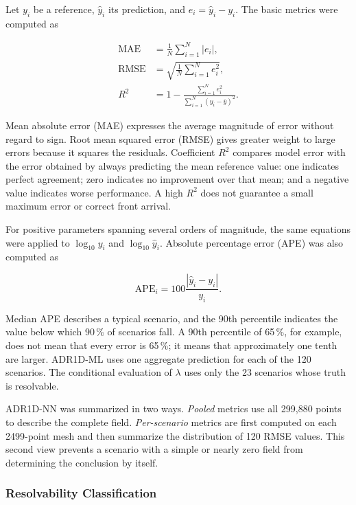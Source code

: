 \documentclass[11pt,a4paper]{article}
\begin{document}
Let $y_i$ be a reference, $\widehat y_i$ its prediction, and
$e_i=\widehat y_i-y_i$. The basic metrics were computed as

\begin{align}
\mathrm{MAE}&=\frac{1}{N}\sum_{i=1}^{N}|e_i|,\\
\mathrm{RMSE}&=\sqrt{\frac{1}{N}\sum_{i=1}^{N}e_i^2},\\
R^2&=1-\frac{\sum_{i=1}^{N}e_i^2}
{\sum_{i=1}^{N}(y_i-\overline y)^2}.
\label{eq:regression-metrics}
\end{align}

Mean absolute error (MAE) expresses the average magnitude of error without
regard to sign. Root mean squared error (RMSE) gives greater weight to large
errors because it squares the residuals. Coefficient $R^2$ compares model error
with the error obtained by always predicting the mean reference value: one
indicates perfect agreement; zero indicates no improvement over that mean; and
a negative value indicates worse performance. A high $R^2$ does not guarantee
a small maximum error or correct front arrival.

For positive parameters spanning several orders of magnitude, the same
equations were applied to $\log_{10}y_i$ and $\log_{10}\widehat y_i$. Absolute
percentage error (APE) was also computed as

\begin{equation}
\mathrm{APE}_i=100\frac{|\widehat y_i-y_i|}{y_i}.
\label{eq:ape}
\end{equation}

Median APE describes a typical scenario, and the 90th percentile indicates the
value below which 90\,\% of scenarios fall. A 90th percentile of 65\,\%, for
example, does not mean that every error is 65\,\%; it means that approximately
one tenth are larger. ADR1D-ML uses one aggregate prediction for each of the
120 scenarios. The conditional evaluation of $\lambda$ uses only the 23
scenarios whose truth is resolvable.

ADR1D-NN was summarized in two ways. \emph{Pooled} metrics use all 299,880
points to describe the complete field. \emph{Per-scenario} metrics are first
computed on each 2499-point mesh and then summarize the distribution of 120
RMSE values. This second view prevents a scenario with a simple or nearly zero
field from determining the conclusion by itself.

\subsubsection{Resolvability Classification}
\end{document}

